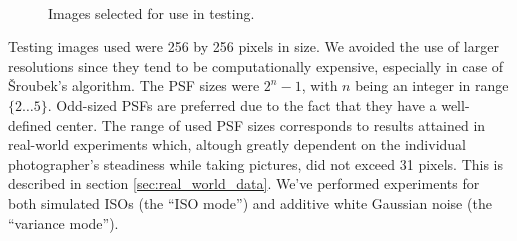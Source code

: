 \documentclass[12pt,notitlepage]{report}
\begin{document}
\begin{figure}[htb]
  \centering
	  ~
	  ~
	  ~
  \caption[Images selected for use in testing.]{Images selected for use in testing.}
  \label{fig:used_images}
\end{figure}



Testing images used were 256 by 256 pixels in size. We avoided the use of larger resolutions since they tend to be computationally expensive, especially in case of Šroubek's algorithm. The PSF sizes were $2^n - 1$, with $n$ being an integer in range $\lbrace 2 \dots 5 \rbrace$. Odd-sized PSFs are preferred due to the fact that they have a well-defined center. The range of used PSF sizes corresponds to results attained in real-world experiments which, altough greatly dependent on the individual photographer's steadiness while taking pictures,  did not exceed 31 pixels. This is described in section \ref{sec:real_world_data}. We've performed experiments for both simulated ISOs (the ``ISO mode'') and additive white Gaussian noise  (the ``variance mode'').
\end{document}
